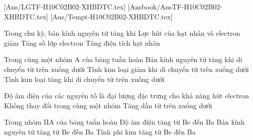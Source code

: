 
[Ans/LGTF-H10C02B02-XHBDTC.tex]
[Ansbook/AnsTF-H10C02B02-XHBDTC.tex]
[Ans/Tempt-H10C02B02-XHBDTC.tex]
\LGexTF
\begin{ex}%
	Trong chu kỳ, bán kính nguyên tử tăng khi
	{\True Lực hút của hạt nhân và electron giảm}
	{\True Tăng số lớp electron}
	{Tăng điện tích hạt nhân}
\end{ex}

\begin{ex}%
	Trong cùng một nhóm A của bảng tuần hoàn
	{\True Bán kính nguyên tử tăng khi di chuyển từ trên xuống dưới}
	{Tính kim loại giảm khi di chuyển từ trên xuống dưới}
	{\True Tính kim loại tăng khi di chuyển từ trên xuống dưới}
\end{ex}
%
\begin{ex}%
	Độ âm điện của các nguyên tố 
	{\True là đại lượng đặc trưng cho khả năng hút electron}
	{Không thay đổi trong cùng một nhóm}
	{Tăng dần từ trên xuống dưới}
\end{ex}
%
\begin{ex}%
	Trong nhóm IIA của bảng tuần hoàn
	{Độ âm điện tăng từ Be đến Ba}
	{\True Bán kính nguyên tử tăng từ Be đến Ba}
	{Tính phi kim tăng từ Be đến Ba}
\end{ex}

